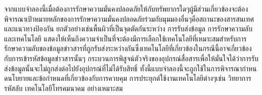\documentclass[../th_cyber_warfare_distilled.tex]{subfiles}
\begin{document}
จากแบบจำลองนี้เมื่อต้องการรักษาความมั่นคงปลอดภัยให้กับทรัพยากรใดๆผู้มีส่วนเกี่ยวข้องจะต้องพิจารณาเป้าหมายหลักของการรักษาความมั่นคงปลอดภัยร่วมกับมุมมองอื่นๆคือสถานะของสารสนเทศ และแนวทางป้องกัน ยกตัวอย่างเช่นพื้นผิวที่เป็นจุดตัดกันระหว่าง การรับส่งข้อมูล การรักษาความลับ และเทคโนโลยี แสดงให้เห็นถึงความจำเป็นที่จะต้องมีการเลือกใช้เทคโนโลยีที่เหมาะสมสำหรับการรักษาความลับของข้อมูลข่าวสารที่ถูกรับส่งระหว่างกันซึ่งเทคโนโลยีที่เกี่ยวข้องในกรณีนี้อาจเกี่ยวข้องกับการเข้ารหัสข้อมูลข่าวสารนั้นๆ กระบวนการพิสูจน์ตัวจริงของอุปกรณ์สื่อสารเพื่อให้มั่นใจได้ว่าการรับส่งข้อมูลนั้นจะไม่ถูกส่งต่อไปยังอุปกรณ์ที่ไม่ได้รับสิทธิ์ ทั้งนี้แบบจำลองนี้จะถูกใช้ในการพิจารณากำหนดนโบยายและข้อกำหนดที่เกี่ยวข้องกับการควบคุม การประยุกต์ใช้งานเทคโนโลยีต่างๆเช่น วิทยาการรหัสลับ เทคโนโลยีโทรคมนาคม อย่างเหมาะสม
\end{document}
